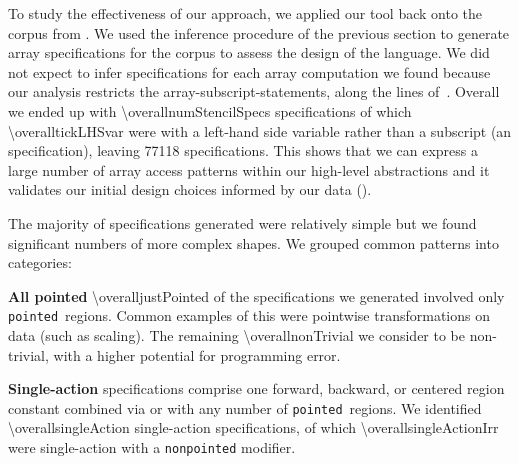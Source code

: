 \newcommand{\overallStencilsSpecs}{77118}
\newcommand\regname[1]{\texttt{#1}}
\newcommand\pointed{\regname{pointed}}
\newcommand\forward{\regname{forward}}

\noindent
To study the effectiveness of our approach, we applied our tool back
onto the corpus from .  We used the inference
procedure of the previous section to generate array specifications
for the corpus to assess the design of the language.
%
%
We did not expect to infer specifications for each array computation
we found because our analysis restricts the
array-subscript-statements, along the lines of~.
Overall we ended up with
\num{\overallnumStencilSpecs} specifications of which
\num{\overalltickLHSvar} were with a left-hand side variable rather
than a subscript (an  specification), leaving
\num{\overallStencilsSpecs}  specifications.
%
This shows that we can express a large number of
array access patterns within our high-level abstractions and it validates our
initial design choices informed by our data ().

The majority of specifications generated were relatively simple but we
found significant numbers of more complex shapes. We grouped common
patterns into categories:

\textbf{All pointed} \num{\overalljustPointed} of the specifications we
generated involved only \pointed\ regions.
Common examples of this were pointwise transformations on data (such
as scaling). The remaining \num{\overallnonTrivial} we consider to
be non-trivial, \ie{} with a higher potential for programming error.

\textbf{Single-action} specifications comprise one
forward, backward, or centered region constant combined via \term{+}
or \term{*} with any number of \pointed\ regions. We identified \num{\overallsingleAction} single-action
specifications, of which \num{\overallsingleActionIrr} were single-action with a
\texttt{nonpointed} modifier.

